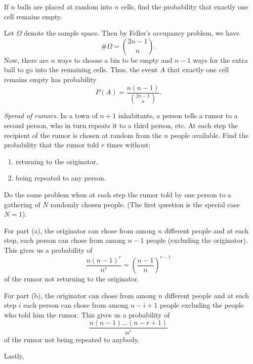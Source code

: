 \begin{problem}[Handout 2, \# 12]
  If \(n\) balls are placed at random into \(n\) cells, find the
  probability that exactly one cell remains empty.
\end{problem}
\begin{solution}
  Let \(\Omega\) denote the sample space. Then by Feller's occupancy
  problem, we have
  \[
    \#\Omega=\binom{2n-1}{n}.
  \]
  Now, there are \(n\) ways to choose a bin to be empty and \(n-1\) ways
  for the extra ball to go into the remaining cells. Thus, the event \(A\)
  that exactly one cell remains empty has probability
  \[
    P(A)=\frac{n(n-1)}{\binom{2n-1}{n}}.
  \]
\end{solution}
\newpage


\begin{problem}[Handout 2, \# 13]
  \emph{Spread of rumors.} In a town of \(n+1\) inhabitants, a person tells
  a rumor to a second person, who in turn repeats it to a third person,
  etc. At each step the recipient of the rumor is chosen at random from the
  \(n\) people available. Find the probability that the rumor told \(r\)
  times without:
  \begin{enumerate}[label=(\alph*),noitemsep]
  \item returning to the originator,
  \item being repeated to any person.
  \end{enumerate}
  Do the same problem when at each step the rumor told by one person to a
  gathering of \(N\) randomly chosen people. (The first question is the
  special case \(N=1\)).
\end{problem}
\begin{solution}
  For part (a), the originator can chose from among \(n\) different people
  and at each step, each person can chose from among \(n-1\) people
  (excluding the originator). This gives us a probability of
  \[
    \frac{n(n-1)^r}{n^r}=\left(\frac{n-1}{n}\right)^{r-1}
  \]
  of the rumor not returning to the originator.

  For part (b), the originator can chose from among \(n\) different people
  and at each step \(i\) each person can chose from among \(n-i+1\) people
  excluding the people who told him the rumor. This gives us a probability
  of
  \[
    \frac{n(n-1)\dotsc(n-r+1)}{n^r}
  \]
  of the rumor not being repeated to anybody.

  Lastly,
\end{solution}
\newpage

